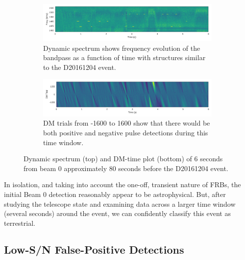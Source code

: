 \documentclass[a4paper,fleqn,usenatbib]{mnras}
\begin{document}
\begin{figure}
    \centering
    \begin{subfigure}[t]{1.0\textwidth}
        \centering\captionsetup{width=.95\linewidth}
        \includegraphics[width=1.0\textwidth]{figures/D20161204_spect_buf21_Beam0.pdf}
        \caption{Dynamic spectrum shows frequency evolution of the bandpass as a
        function of time with structures similar to the D20161204 event.
        }
        \label{fig:beam0_dynamic_spec_80s}
    \end{subfigure}
    \begin{subfigure}[t]{1.0\textwidth}
        \centering\captionsetup{width=.95\linewidth}
        \includegraphics[width=1.0\textwidth]{figures/D20161204_dmtrials_buf21_Beam0.pdf}
        \caption{DM trials from -1600 to 1600 show that there would be both
        positive and negative pulse detections during this time window.
        }
        \label{fig:beam0_dmtrials_80s}
    \end{subfigure}
    \caption{Dynamic spectrum (top) and DM-time plot (bottom) of 6 seconds from
    beam 0 approximately 80 seconds before the D20161204 event.
    }
    \label{fig:beamo0_80s}
\end{figure}

In isolation, and taking into account the one-off, transient nature of FRBs, the
initial Beam 0 detection reasonably appear to be astrophysical. But, after
studying the telescope state and examining data across a larger time window
(several seconds) around the event, we can confidently classify this event as
terrestrial.

\subsection{Low-S/N False-Positive Detections}
\label{sec:low_snr}
\end{document}
